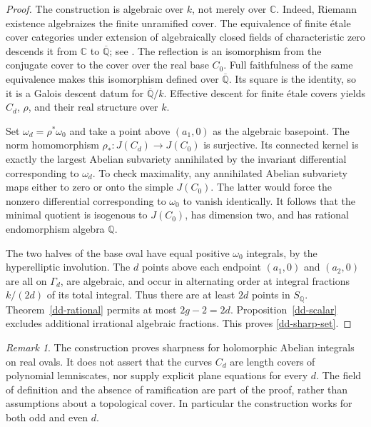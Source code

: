 \documentclass[11pt,a4paper]{article}
\theoremstyle{definition}
\theoremstyle{remark}
\newtheorem{remark}[theorem]{Remark}
\numberwithin{equation}{section}
\newcommand{\Qbar}{\overline{\mathbb Q}}
\begin{document}
\begin{proof}
The construction is algebraic over $k$, not merely over $\mathbb C$.
Indeed, Riemann existence algebraizes the finite unramified cover.
The equivalence of finite \'etale cover categories under extension
of algebraically closed fields of characteristic zero descends it
from $\mathbb C$ to $\Qbar$; see
\cite[Remark~3.3(c) and Theorem~3.4]{dd-Milne2013}.
The reflection is an isomorphism from the conjugate cover to the
cover over the real base $C_0$.  Full faithfulness of the same
equivalence makes this isomorphism defined over $\Qbar$.
Its square is the identity, so it is a Galois descent datum for
$\Qbar/k$.  Effective descent for finite \'etale covers yields
$C_d$, $\rho$, and their real structure over $k$.

Set $\omega_d=\rho^*\omega_0$ and take a point above
$(a_1,0)$ as the algebraic basepoint.  The norm homomorphism
$\rho_*:J(C_d)\to J(C_0)$ is surjective.  Its connected kernel is
exactly the largest Abelian subvariety annihilated by the invariant
differential corresponding to $\omega_d$.  To check maximality,
any annihilated Abelian subvariety maps either to zero or onto the
simple $J(C_0)$.  The latter would force the nonzero differential
corresponding to $\omega_0$ to vanish identically.  It follows that
the minimal quotient is isogenous to $J(C_0)$, has dimension two,
and has rational endomorphism algebra $\mathbb Q$.

The two halves of the base oval have equal positive $\omega_0$
integrals, by the hyperelliptic involution.  The $d$ points above
each endpoint $(a_1,0)$ and $(a_2,0)$ are all on $\Gamma_d$, are
algebraic, and occur in alternating order at integral fractions
$k/(2d)$ of its total integral.  Thus there are at least $2d$
points in $S_{\mathbb Q}$.  Theorem~\ref{dd-rational} permits at
most $2g-2=2d$.  Proposition~\ref{dd-scalar} excludes additional
irrational algebraic fractions.  This proves \eqref{dd-sharp-set}.
\end{proof}

\begin{remark}\label{dd-sharp-scope}
The construction proves sharpness for holomorphic Abelian integrals
on real ovals.  It does not assert that the curves $C_d$ are length
covers of polynomial lemniscates, nor supply explicit plane
equations for every $d$.  The field of definition and the absence
of ramification are part of the proof, rather than assumptions
about a topological cover.  In particular the construction works
for both odd and even $d$.
\end{remark}
\end{document}
